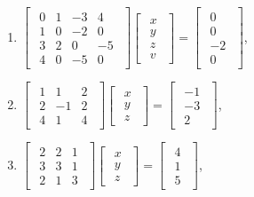 \documentclass{article}
\begin{document}
\begin{enumerate}
\begin{enumerate}
            \item $\begin{bmatrix}\begin{array}{rrrr} 0 & 1 & -3 & 4\\ 1 & 0 & -2 & 0\\ 3 & 2 & 0 & -5\\ 4 & 0 & -5 & 0 \end{array}\end{bmatrix} \begin{bmatrix}\begin{array}{r} x\\ y\\ z\\ v \end{array}\end{bmatrix} = \begin{bmatrix}\begin{array}{r} 0\\ 0\\ -2\\ 0 \end{array}\end{bmatrix}$,

            \item $\begin{bmatrix}\begin{array}{rrr} 1 & 1 & 2\\ 2 & -1 & 2\\ 4 & 1 & 4 \end{array}\end{bmatrix} \begin{bmatrix}\begin{array}{r} x\\ y\\ z \end{array}\end{bmatrix} = \begin{bmatrix}\begin{array}{r} -1\\ -3\\ 2 \end{array}\end{bmatrix}$,

            \item $\begin{bmatrix}\begin{array}{rrr} 2 & 2 & 1\\ 3 & 3 & 1\\ 2 & 1 & 3 \end{array}\end{bmatrix} \begin{bmatrix}\begin{array}{r} x\\ y\\ z \end{array}\end{bmatrix} = \begin{bmatrix}\begin{array}{r} 4\\ 1\\ 5 \end{array}\end{bmatrix}$,


\end{enumerate}
\end{enumerate}
\end{document}
